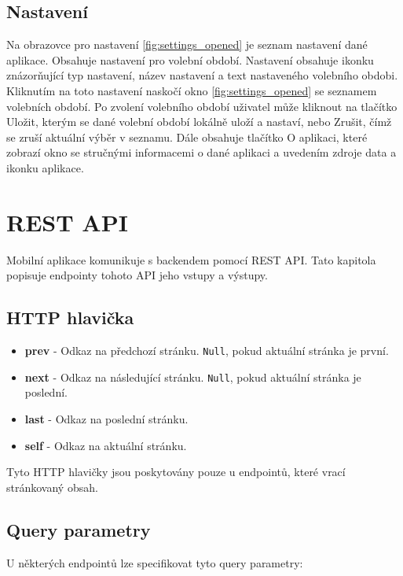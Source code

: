 \subsection*{Nastavení}
\label{ssec:design-settings}
	
Na obrazovce pro nastavení \ref{fig:settings_opened} je seznam nastavení dané aplikace. Obsahuje nastavení pro volební období. Nastavení obsahuje ikonku znázorňující typ nastavení, název nastavení a text nastaveného volebního obdobi. Kliknutím na toto nastavení naskočí okno \ref{fig:settings_opened} se seznamem volebních období. Po zvolení volebního období uživatel může kliknout na tlačítko Uložit, kterým se dané volební období lokálně uloží a nastaví, nebo Zrušit, čímž se zruší aktuální výběr \linebreak v seznamu. Dále obsahuje tlačítko O aplikaci, které zobrazí okno se stručnými informacemi \linebreak o dané aplikaci a uvedením zdroje data a ikonku aplikace.

\section{REST API}

Mobilní aplikace komunikuje s backendem pomocí REST API. Tato kapitola popisuje endpointy tohoto  API jeho vstupy a výstupy.

\subsection*{HTTP hlavička}

\begin{itemize}
	\item \textbf{prev} - Odkaz na předchozí stránku. \lstinline|Null|, pokud aktuální stránka je první.
	\item \textbf{next} - Odkaz na následující stránku. \lstinline|Null|, pokud aktuální stránka je poslední.
	\item \textbf{last} - Odkaz na poslední stránku.
	\item \textbf{self} - Odkaz na aktuální stránku.
\end{itemize}

\noindent Tyto HTTP hlavičky jsou poskytovány pouze u endpointů, které vrací stránkovaný obsah.

\subsection*{Query parametry}
U některých endpointů lze specifikovat tyto query parametry:

